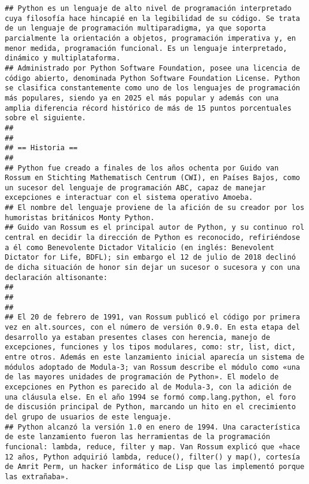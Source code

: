 \documentclass[
]{article}
\begin{document}
\begin{verbatim}
## Python es un lenguaje de alto nivel de programación interpretado cuya filosofía hace hincapié en la legibilidad de su código. Se trata de un lenguaje de programación multiparadigma, ya que soporta parcialmente la orientación a objetos, programación imperativa y, en menor medida, programación funcional. Es un lenguaje interpretado, dinámico y multiplataforma.
## Administrado por Python Software Foundation, posee una licencia de código abierto, denominada Python Software Foundation License.​ Python se clasifica constantemente como uno de los lenguajes de programación más populares, siendo ya en 2025 el más popular y además con una amplia diferencia récord histórico de más de 15 puntos porcentuales sobre el siguiente.​
## 
## 
## == Historia ==
## 
## Python fue creado a finales de los años ochenta por Guido van Rossum en Stichting Mathematisch Centrum (CWI),​ en Países Bajos, como un sucesor del lenguaje de programación ABC, capaz de manejar excepciones e interactuar con el sistema operativo Amoeba.​
## El nombre del lenguaje proviene de la afición de su creador por los humoristas británicos Monty Python.​
## Guido van Rossum es el principal autor de Python, y su continuo rol central en decidir la dirección de Python es reconocido, refiriéndose a él como Benevolente Dictador Vitalicio (en inglés: Benevolent Dictator for Life, BDFL); sin embargo el 12 de julio de 2018 declinó de dicha situación de honor sin dejar un sucesor o sucesora y con una declaración altisonante:​
## 
##  
## 
## El 20 de febrero de 1991, van Rossum publicó el código por primera vez en alt.sources, con el número de versión 0.9.0.​ En esta etapa del desarrollo ya estaban presentes clases con herencia, manejo de excepciones, funciones y los tipos modulares, como: str, list, dict, entre otros. Además en este lanzamiento inicial aparecía un sistema de módulos adoptado de Modula-3; van Rossum describe el módulo como «una de las mayores unidades de programación de Python».​ El modelo de excepciones en Python es parecido al de Modula-3, con la adición de una cláusula else.​ En el año 1994 se formó comp.lang.python, el foro de discusión principal de Python, marcando un hito en el crecimiento del grupo de usuarios de este lenguaje.
## Python alcanzó la versión 1.0 en enero de 1994. Una característica de este lanzamiento fueron las herramientas de la programación funcional: lambda, reduce, filter y map.​ Van Rossum explicó que «hace 12 años, Python adquirió lambda, reduce(), filter() y map(), cortesía de Amrit Perm, un hacker informático de Lisp que las implementó porque las extrañaba».​

\end{verbatim}
\end{document}

